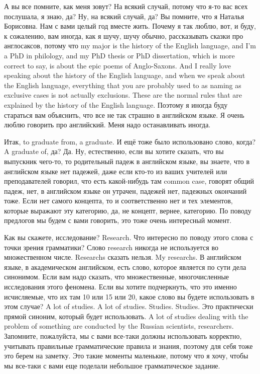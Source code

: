 \documentclass[main.tex]{subfiles}
\begin{document}
А вы все помните, как меня зовут?
На всякий случай, потому что я-то вас всех послушала, я знаю, да?
Ну, на всякий случай, да?
Вы помните, что я Наталья Борисовна.
Нам с вами целый год вместе жить.
Почему я так люблю, вот, и буду, к сожалению, вам иногда, как я шучу, шучу обычно, рассказывать сказки про англосаксов, потому что my major is the history of the English language, and I'm a PhD in philology, and my PhD thesis or PhD dissertation, which is more correct to say, is about the epic poems of Anglo-Saxons.
And I really love speaking about the history of the English language, and when we speak about the English language, everything that you are probably used to as naming as exclusive cases is not actually exclusions.
These are the normal rules that are explained by the history of the English language.
Поэтому я иногда буду стараться вам объяснить, что все не так страшно в английском языке.
Я очень люблю говорить про английский.
Меня надо останавливать иногда.

Итак, to graduate from, a graduate.
И ещё тоже было использовано слово, когда? A graduate of, да? Да.
Ну, естественно, если вы хотите сказать, что вы выпускник чего-то, то родительный падеж в английском языке, вы знаете, что в английском языке нет падежей, даже если кто-то из ваших учителей или преподавателей говорил, что есть какой-нибудь там common case, говорят общий падеж, нет, в английском языке он утрачен, падежей нет, падежных окончаний тоже.
Если нет самого концепта, то и соответственно нет и тех элементов, которые выражают эту категорию, да, не концепт, вернее, категорию.
По поводу предлогов мы будем с вами говорить, это тоже очень интересный момент.

Как вы скажете, исследование? Research.
Что интересно по поводу этого слова с точки зрения грамматики?
Слово research никогда не используется во множественном числе.
Researchs сказать нельзя.
My researchs.
В английском языке, в академическом английском, есть слово, которое является по сути дела синонимом.
Если вам надо сказать, что множественные, многочисленные исследования этого феномена.
Если вы хотите подчеркнуть, что это именно исчисляемые, что их там 10 или 15 или 20, какое слово вы будете использовать в этом случае?
A lot of studies.
A lot of studies.
Studies.
Studies.
Это практически прямой синоним, который будет использовать.
A lot of studies dealing with the problem of something are conducted by the Russian scientists, researchers.
Запомните, пожалуйста, мы с вами все-таки должны использовать корректно, учитывать правильные грамматические правила и знания, поэтому для себя тоже это берем на заметку.
Это такие моменты маленькие, потому что я хочу, чтобы мы все-таки с вами еще поделали небольшое грамматическое задание.
\end{document}
